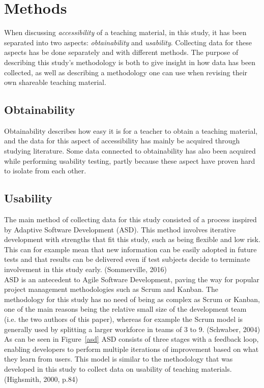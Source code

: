 \chapter{Methods}
When discussing \textit{accessibility} of a teaching material, in this study, it has been separated into two aspects: \textit{obtainability} and \textit{usability}. Collecting data for these aspects has be done separately and with different methods. The purpose of describing this study's methodology is both to give insight in how data has been collected, as well as describing a methodology one can use when revising their own shareable teaching material.

\section{Obtainability}
Obtainability describes how easy it is for a teacher to obtain a teaching material, and the data for this aspect of accessibility has mainly be acquired through studying literature. Some data connected to obtainability has also been acquired while performing usability testing, partly because these aspect have proven hard to isolate from each other.

\section{Usability}
The main method of collecting data for this study consisted of a process inspired by Adaptive Software Development (ASD). This method involves iterative development with strengths that fit this study, such as being flexible and low risk. This can for example mean that new information
can be easily adopted in future tests and that results can be delivered even if test subjects decide to terminate involvement in this study early. (Sommerville, 2016)\\
ASD is an antecedent to Agile Software Development, paving the way for popular project management methodologies such as Scrum and Kanban. The methodology for this study has no need of being as complex as Scrum or Kanban, one of the main reasons being the relative small size of the development team (i.e. the two authors of this paper), whereas for example the Scrum model is generally used by splitting a larger workforce in teams of 3 to 9. (Schwaber, 2004)\\
As can be seen in Figure~\ref{asd} ASD consists of three stages with a feedback loop, enabling developers to perform multiple iterations of improvement based on what they learn from users. This model is similar to the methodology that was developed in this study to collect data on usability of teaching materials. (Highsmith, 2000, p.84)\\

